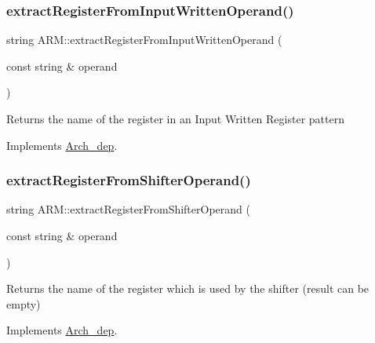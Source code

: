 \mbox{\label{classARM_a32da27e5c024c3291b12a62ffc2b3070}} 
\subsubsection{\texorpdfstring{extract\+Register\+From\+Input\+Written\+Operand()}{extractRegisterFromInputWrittenOperand()}}
{\footnotesize\ttfamily string A\+R\+M\+::extract\+Register\+From\+Input\+Written\+Operand (\begin{DoxyParamCaption}\item[{const string \&}]{operand }\end{DoxyParamCaption})\hspace{0.3cm}{\ttfamily [virtual]}}

Returns the name of the register in an Input Written Register pattern 

Implements \hyperlink{classArch__dep_a286da739265c852e98f2efd622615b96}{Arch\+\_\+dep}.

\mbox{\label{classARM_a12e96058317496e995642601bd65fb12}} 
\subsubsection{\texorpdfstring{extract\+Register\+From\+Shifter\+Operand()}{extractRegisterFromShifterOperand()}}
{\footnotesize\ttfamily string A\+R\+M\+::extract\+Register\+From\+Shifter\+Operand (\begin{DoxyParamCaption}\item[{const string \&}]{operand }\end{DoxyParamCaption})\hspace{0.3cm}{\ttfamily [virtual]}}

Returns the name of the register which is used by the shifter (result can be empty) 

Implements \hyperlink{classArch__dep_a58002697a2ce55ff09eee606807cfab3}{Arch\+\_\+dep}.

\mbox{\label{classARM_abbd225e086b20313a6eb5afbb45b955a}} 

